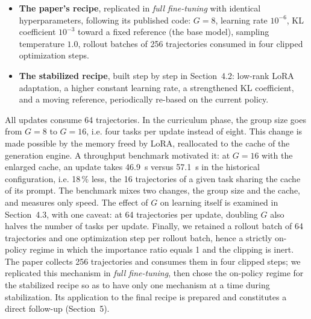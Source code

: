 \documentclass[11pt,a4paper]{article}
\begin{document}
\begin{itemize}
    \item \textbf{The paper's recipe}, replicated in \emph{full fine-tuning} with identical hyperparameters, following its published code: $G=8$, learning rate $10^{-6}$, KL coefficient $10^{-3}$ toward a fixed reference (the base model), sampling temperature $1.0$, rollout batches of 256 trajectories consumed in four clipped optimization steps.
    \item \textbf{The stabilized recipe}, built step by step in Section~4.2: low-rank LoRA adaptation, a higher constant learning rate, a strengthened KL coefficient, and a moving reference, periodically re-based on the current policy.
\end{itemize}

All updates consume 64 trajectories. In the curriculum phase, the group size goes from $G=8$ to $G=16$, i.e. four tasks per update instead of eight. This change is made possible by the memory freed by LoRA, reallocated to the cache of the generation engine. A throughput benchmark motivated it: at $G=16$ with the enlarged cache, an update takes 46.9~s versus 57.1~s in the historical configuration, i.e. 18\,\% less, the 16 trajectories of a given task sharing the cache of its prompt. The benchmark mixes two changes, the group size and the cache, and measures only speed. The effect of $G$ on learning itself is examined in Section~4.3, with one caveat: at 64 trajectories per update, doubling $G$ also halves the number of tasks per update. Finally, we retained a rollout batch of 64 trajectories and one optimization step per rollout batch, hence a strictly on-policy regime in which the importance ratio equals 1 and the clipping is inert. The paper collects 256 trajectories and consumes them in four clipped steps; we replicated this mechanism in \emph{full fine-tuning}, then chose the on-policy regime for the stabilized recipe so as to have only one mechanism at a time during stabilization. Its application to the final recipe is prepared and constitutes a direct follow-up (Section~5).
\end{document}
